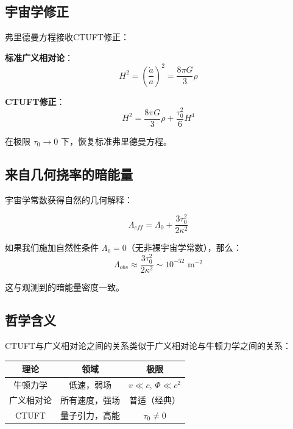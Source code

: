 \subsection{宇宙学修正}

弗里德曼方程接收CTUFT修正：

\textbf{标准广义相对论}：
\begin{equation}
    H^2 = \left(\frac{\dot{a}}{a}\right)^2 = \frac{8\pi G}{3}\rho
\end{equation}

\textbf{CTUFT修正}：
\begin{equation}
    H^2 = \frac{8\pi G}{3}\rho + \frac{\tau_0^2}{6}H^4
    \label{eq:modified_friedmann}
\end{equation}

在极限 $\tau_0 \to 0$ 下，恢复标准弗里德曼方程。

\subsection{来自几何挠率的暗能量}

宇宙学常数获得自然的几何解释：

\begin{equation}
    \Lambda_{eff} = \Lambda_0 + \frac{3\tau_0^2}{2\kappa^2}
    \label{eq:dark_energy_torsion}
\end{equation}

如果我们施加自然性条件 $\Lambda_0 = 0$（无非裸宇宙学常数），那么：
\begin{equation}
    \Lambda_{obs} \approx \frac{3\tau_0^2}{2\kappa^2} \sim 10^{-52} \text{ m}^{-2}
\end{equation}

这与观测到的暗能量密度一致。

\subsection{哲学含义}

CTUFT与广义相对论之间的关系类似于广义相对论与牛顿力学之间的关系：

\begin{center}
\begin{tabular}{@{}ccc@{}}
\hline
理论 & 领域 & 极限 \\
\hline
牛顿力学 & 低速，弱场 & $v \ll c$, $\Phi \ll c^2$ \\
广义相对论 & 所有速度，强场 & 普适（经典） \\
CTUFT & 量子引力，高能 & $\tau_0 \neq 0$ \\
\hline
\end{tabular}
\end{center}

